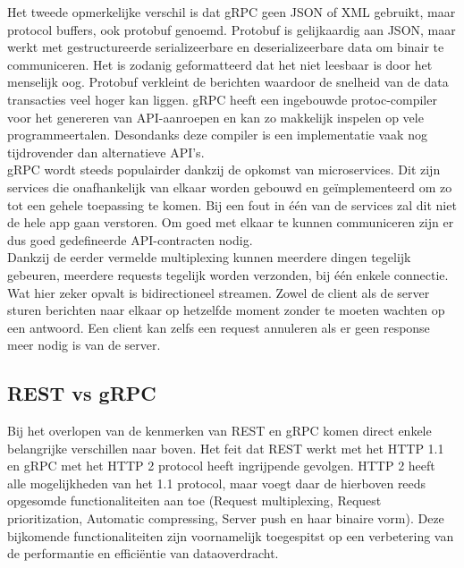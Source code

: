Het tweede opmerkelijke verschil is dat gRPC geen JSON of XML gebruikt, maar protocol buffers, ook protobuf genoemd. Protobuf is gelijkaardig aan JSON,
maar werkt met gestructureerde serializeerbare en deserializeerbare data om binair te communiceren. Het is zodanig geformatteerd dat het niet leesbaar is
door het menselijk oog. Protobuf verkleint de berichten waardoor de snelheid van de data transacties veel hoger kan liggen. gRPC heeft een ingebouwde
protoc-compiler voor het genereren van API-aanroepen en kan zo makkelijk inspelen op vele programmeertalen.
Desondanks deze compiler is een implementatie vaak nog tijdrovender dan alternatieve API's.
~\autocite{dreamfactory}\\

gRPC wordt steeds populairder dankzij de opkomst van microservices. Dit zijn services die onafhankelijk van elkaar worden gebouwd en geïmplementeerd om
zo tot een gehele toepassing te komen. Bij een fout in één van de services zal dit niet de hele app gaan verstoren.
Om goed met elkaar te kunnen communiceren zijn er dus goed gedefineerde API-contracten nodig.
~\autocite{microsoft}\\

Dankzij de eerder vermelde multiplexing kunnen meerdere dingen tegelijk gebeuren, meerdere requests tegelijk worden verzonden, bij één enkele connectie.
Wat hier zeker opvalt is bidirectioneel streamen. Zowel de client als de server sturen berichten naar elkaar op hetzelfde moment zonder te moeten wachten
op een antwoord. Een client kan zelfs een request annuleren als er geen response meer nodig is van de server.
~\autocite{freecodecamp}\\

\subsection{REST vs gRPC}

Bij het overlopen van de kenmerken van REST en gRPC komen direct enkele belangrijke verschillen naar boven.
Het feit dat REST werkt met het HTTP 1.1 en gRPC met het HTTP 2 protocol heeft ingrijpende gevolgen. HTTP 2 heeft alle mogelijkheden van het 1.1 protocol,
maar voegt daar de hierboven reeds opgesomde functionaliteiten aan toe (Request multiplexing, Request prioritization, Automatic compressing,
Server push en haar binaire vorm). Deze bijkomende functionaliteiten zijn voornamelijk toegespitst op een verbetering van de performantie en efficiëntie van dataoverdracht.
~\autocite{cloudflare}
~\autocite{tutsplus}\\


